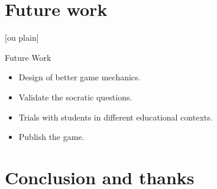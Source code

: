 \documentclass[aspectratio=169]{beamer}
\begin{document}
\section{Future work}

[ou plain]
\begin{frame}{Future Work}
    \begin{itemize}
        \item Design of better game mechanics.
        \item Validate the socratic questions.
        \item Trials with students in different educational contexts.
        \item Publish the game.
    \end{itemize}
\end{frame}

\section{Conclusion and thanks}

\end{document}
